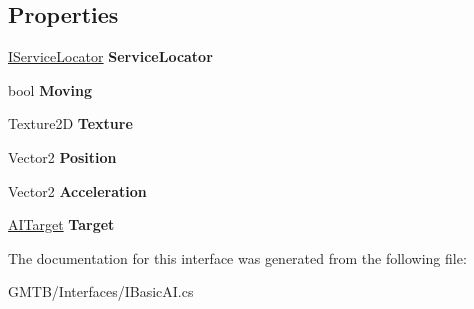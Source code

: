 \subsection*{Properties}
\begin{DoxyCompactItemize}
\item 
\mbox{\label{interface_g_m_t_b_1_1_interfaces_1_1_i_basic_a_i_a7607d6702c49f0c1375e5b45fc681cfd}} 
\mbox{\hyperlink{interface_g_m_t_b_1_1_interfaces_1_1_i_service_locator}{I\+Service\+Locator}} {\bfseries Service\+Locator}
\item 
\mbox{\label{interface_g_m_t_b_1_1_interfaces_1_1_i_basic_a_i_a93fae5df951277b6e479a5f168032485}} 
bool {\bfseries Moving}
\item 
\mbox{\label{interface_g_m_t_b_1_1_interfaces_1_1_i_basic_a_i_a67ada98d6563d52413cce82ca06eb908}} 
Texture2D {\bfseries Texture}
\item 
\mbox{\label{interface_g_m_t_b_1_1_interfaces_1_1_i_basic_a_i_a5b9a8bb60581a3c5fffffc7740c74dc3}} 
Vector2 {\bfseries Position}
\item 
\mbox{\label{interface_g_m_t_b_1_1_interfaces_1_1_i_basic_a_i_ac6e144b03cdb7a046cebe50cff54c992}} 
Vector2 {\bfseries Acceleration}
\item 
\mbox{\label{interface_g_m_t_b_1_1_interfaces_1_1_i_basic_a_i_a8708071f31559460d0fceb5d78e57ba5}} 
\mbox{\hyperlink{interface_g_m_t_b_1_1_interfaces_1_1_a_i_target}{A\+I\+Target}} {\bfseries Target}
\end{DoxyCompactItemize}


The documentation for this interface was generated from the following file\+:\begin{DoxyCompactItemize}
\item 
G\+M\+T\+B/\+Interfaces/I\+Basic\+A\+I.\+cs\end{DoxyCompactItemize}
